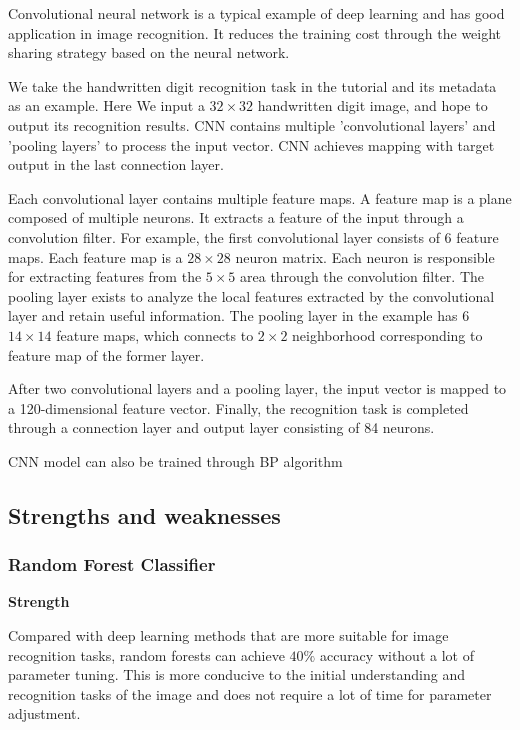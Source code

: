 \indent

Convolutional neural network is a typical example of deep learning and has good application in image recognition. It reduces the training cost through the weight sharing strategy based on the neural network.

We take the handwritten digit recognition task in the tutorial and its metadata \cite{lecun1995convolutional} as an example. Here We input a $32\times 32$ handwritten digit image, and hope to output its recognition results. CNN contains multiple 'convolutional layers' and 'pooling layers' to process the input vector. CNN achieves mapping with target output in the last connection layer.

Each convolutional layer contains multiple feature maps. A feature map is a plane composed of multiple neurons. It extracts a feature of the input through a convolution filter. For example, the first convolutional layer consists of 6 feature maps. Each feature map is a $28\times 28$ neuron matrix. Each neuron is responsible for extracting features from the $5\times5$ area through the convolution filter. The pooling layer exists to analyze the local features extracted by the convolutional layer and retain useful information. The pooling layer in the example has $6$ $14\times14$ feature maps, which connects to $2\times2$ neighborhood corresponding to feature map of the former layer.

After two convolutional layers and a pooling layer, the input vector is mapped to a 120-dimensional feature vector. Finally, the recognition task is completed through a connection layer and output layer consisting of 84 neurons.

CNN model can also be trained through BP algorithm

\subsection{Strengths and weaknesses}

\subsubsection{Random Forest Classifier}

\noindent\textbf{Strength}

Compared with deep learning methods that are more suitable for image recognition tasks, random forests can achieve $40\%$ accuracy without a lot of parameter tuning. This is more conducive to the initial understanding and recognition tasks of the image and does not require a lot of time for parameter adjustment. 

